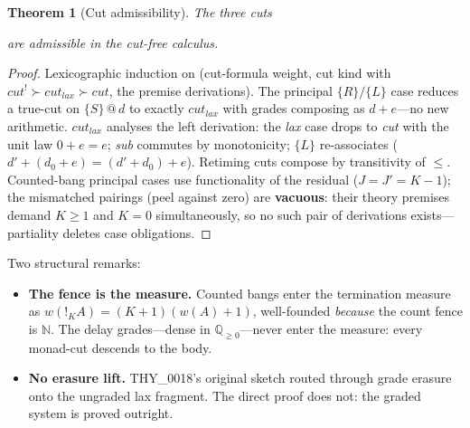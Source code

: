 \documentclass[11pt]{article}
\makeatletter
\newcommand{\lax}[2]{\{#1\}\mathbin{@}#2}       %
\newcommand{\gbang}[1]{{!}_{#1}}                 %
\newcommand{\tr}{\;\mathit{true}}                %
\newcommand{\laxjdg}[1]{\;\mathit{lax}@{#1}}    %
\newcommand{\QQ}{\mathbb{Q}}                     %
\newcommand{\NN}{\mathbb{N}}                     %
\newtheorem{theorem}{Theorem}[section]
\theoremstyle{definition}
\theoremstyle{remark}
\makeatother
\begin{document}
\begin{theorem}[Cut admissibility]
\label{thm:cut}
The three cuts
are admissible in the cut-free calculus.
\end{theorem}
\begin{proof}
Lexicographic induction on (cut-formula weight, cut kind with
$\mathit{cut}^{!} \succ \mathit{cut}_{\mathit{lax}} \succ \mathit{cut}$, the
premise derivations).  The principal $\mathit{\{R\}}/\mathit{\{L\}}$ case reduces
a true-cut on $\lax{S}{d}$ to exactly $\mathit{cut}_{\mathit{lax}}$ with grades
composing as $d+e$---no new arithmetic.  $\mathit{cut}_{\mathit{lax}}$ analyses
the left derivation: the \textit{lax} case drops to \textit{cut} with the unit
law $0+e=e$; \textit{sub} commutes by monotonicity; $\mathit{\{L\}}$ re-associates
($d' + (d_0{+}e) = (d'{+}d_0) + e$).  Retiming cuts compose by transitivity of
$\leq$.  Counted-bang principal cases use functionality of the residual ($J = J'
= K{-}1$); the mismatched pairings (peel against zero) are \textbf{vacuous}: their
theory premises demand $K \geq 1$ and $K = 0$ simultaneously, so no such pair of
derivations exists---partiality deletes case obligations.
\end{proof}

Two structural remarks:

\begin{itemize}
\item \textbf{The fence is the measure.}  Counted bangs enter the termination
  measure as $w(\gbang{K} A) = (K{+}1)(w(A){+}1)$, well-founded \emph{because}
  the count fence is $\NN$.  The delay grades---dense in $\QQ_{\geq 0}$---never
  enter the measure: every monad-cut descends to the body.
\item \textbf{No erasure lift.}  THY\_0018's original sketch routed through grade
  erasure onto the ungraded lax fragment.  The direct proof does not: the graded
  system is proved outright.
\end{itemize}
\end{document}
